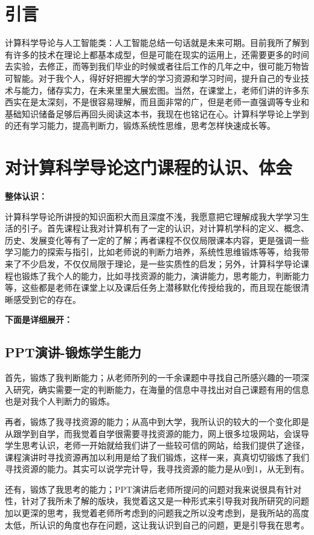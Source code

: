 \documentclass{article}
\begin{document}
\thispagestyle{empty}
\newpage
\setcounter{page}{1}
\section{引言}
计算科学导论与人工智能类：人工智能总结一句话就是未来可期。目前我所了解到有许多的技术在理论上都基本成型，但是可能在现实的运用上，还需要更多的时间去实验，去修正，而等到我们毕业的时候或者往后工作的几年之中，很可能万物皆可智能。对于我个人，得好好把握大学的学习资源和学习时间，提升自己的专业技术与能力，储存实力，在未来里里大展宏图。当然，在课堂上，老师们讲的许多东西实在是太深刻，不是很容易理解，而且面非常的广，但是老师一直强调等专业和基础知识储备足够后再回头阅读这本书，我现在也铭记在心。计算科学导论上学到的还有学习能力，提高判断力，锻炼系统性思维，思考怎样快速成长等。

\section{对计算科学导论这门课程的认识、体会}
\textbf{整体认识：}\par 
计算科学导论所讲授的知识面积大而且深度不浅，我愿意把它理解成我大学学习生活的引子。首先课程让我对计算机有了一定的认识，对计算机学科的定义、概念、历史、发展变化等有了一定的了解；再者课程不仅仅局限课本内容，更是强调一些学习能力的探索与指引，比如老师说的判断力培养，系统性思维锻炼等等，给我带来了不少启发，不仅仅局限于理论，是一些实质性的启发；另外，计算科学导论课程也锻炼了我个人的能力，比如寻找资源的能力，演讲能力，思考能力，判断能力等，这些都是老师在课堂上以及课后任务上潜移默化传授给我的，而且现在能很清晰感受到它的存在。
\par 
\textbf{下面是详细展开：}\par 
\subsection{PPT演讲-锻炼学生能力}
首先，锻炼了我判断能力；从老师所列的一千余课题中寻找自己所感兴趣的一项深入研究，确实需要一定的判断能力，在海量的信息中寻找出对自己课题有用的信息也是对我个人判断力的锻炼。 \par
再者，锻炼了我寻找资源的能力；从高中到大学，我所认识的较大的一个变化即是从跟学到自学，而我觉着自学很需要寻找资源的能力，网上很多垃圾网站，会误导学生思考认识，老师一开始就给我们讲了一些较可信的网站，给我们提供了途径，课程演讲时寻找资源再加以利用是给了我们锻炼，这样一来，真真切切锻炼了我们寻找资源的能力。其实可以说学完计导，我寻找资源的能力是从0到1，从无到有。\par
还有，锻炼了我思考的能力；PPT演讲后老师所提问的问题对我来说很具有针对性，针对了我所未了解的版块，我觉着这又是一种形式来引导我对我所研究的问题加以更深的思考，我觉着老师所考虑到的问题我之所以没考虑到，是我所站的高度太低，所认识的角度也存在问题，这让我认识到自己的问题，更是引导我在思考。\par
\end{document}
